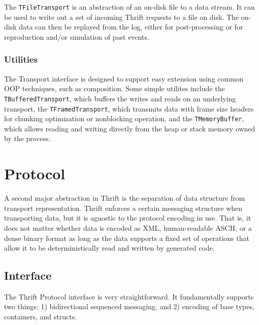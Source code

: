 \documentclass[nocopyrightspace,blockstyle]{sigplanconf}
\begin{document}
The \texttt{TFileTransport} is an abstraction of an on-disk file to a data
stream. It can be used to write out a set of incoming Thrift requests to a file
on disk. The on-disk data can then be replayed from the log, either for
post-processing or for reproduction and/or simulation of past events.

\subsubsection{Utilities}

The Transport interface is designed to support easy extension using common
OOP techniques, such as composition. Some simple utilites include the
\texttt{TBufferedTransport}, which buffers the writes and reads on an
underlying transport, the \texttt{TFramedTransport}, which transmits data with frame
size headers for chunking optimization or nonblocking operation, and the
\texttt{TMemoryBuffer}, which allows reading and writing directly from the heap
or stack memory owned by the process.

\section{Protocol}

A second major abstraction in Thrift is the separation of data structure from
transport representation. Thrift enforces a certain messaging structure when
transporting data, but it is agnostic to the protocol encoding in use. That is,
it does not matter whether data is encoded as XML, human-readable ASCII, or a
dense binary format as long as the data supports a fixed set of operations
that allow it to be deterministically read and written by generated code.

\subsection{Interface}

The Thrift Protocol interface is very straightforward. It fundamentally
supports two things: 1) bidirectional sequenced messaging, and
2) encoding of base types, containers, and structs.
\end{document}
